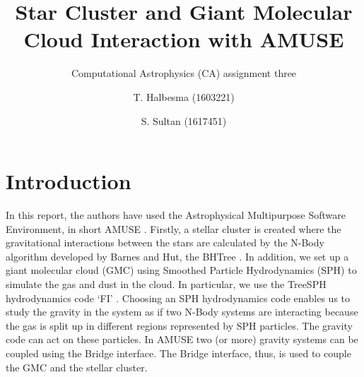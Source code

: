 \documentclass{aa}
\begin{document}
   \title{Star Cluster and Giant Molecular Cloud Interaction with AMUSE}

   \subtitle{Computational Astrophysics (CA) assignment three}

   \author{T. Halbesma (1603221)
          \and
          S. Sultan (1617451)
          }




  \abstract
   {}
   {}
   {}
   {}
   {}


   \maketitle
%

\section{Introduction}
In this report, the authors have used the Astrophysical Multipurpose Software Environment, in short AMUSE \citep{2009NewA...14..369P, 2013CoPhC.183..456P, 2013A&A...557A..84P}. Firstly, a stellar cluster is created where the gravitational interactions between the stars are calculated by the N-Body algorithm developed by Barnes and Hut, the BHTree \cite{1986Natur.324..446B}. In addition, we set up a giant molecular cloud (GMC) using Smoothed Particle Hydrodynamics (SPH) to simulate the gas and dust in the cloud. In particular, we use the TreeSPH hydrodynamics code `FI' \citep{1989ApJS...70..419H, 1997A&A...325..972G, 2004A&A...422...55P, 2005PhDT........17P}. Choosing an SPH hydrodynamics code enables us to study the gravity in the system as if two N-Body systems are interacting because the gas is split up in different regions represented by SPH particles. The gravity code can act on these particles. In AMUSE two (or more) gravity systems can be coupled using the Bridge interface. The Bridge interface, thus, is used to couple the GMC and the stellar cluster.
\end{document}
